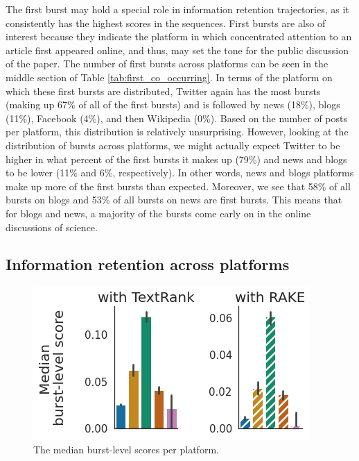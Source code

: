 \documentclass[letterpaper]{article} %
\begin{document}
The first burst may hold a special role in information retention trajectories, as it consistently has the highest scores in the sequences. First bursts are also of interest because they indicate the platform in which concentrated attention to an article first appeared online, and thus, may set the tone for the public discussion of the paper. The number of first bursts across platforms can be seen in the middle section of Table \ref{tab:first_co_occurring}. In terms of the platform on which these first bursts are distributed, Twitter again has the most bursts (making up 67\% of all of the first bursts) and is followed by news (18\%), blogs (11\%), Facebook (4\%), and then Wikipedia (0\%). Based on the number of posts per platform, this distribution is relatively unsurprising. However, looking at the distribution of bursts across platforms, we might actually expect Twitter to be higher in what percent of the first bursts it makes up (79\%) and news and blogs to be lower (11\% and 6\%, respectively). In other words, news and blogs platforms make up more of the first bursts than expected. Moreover, we see that 58\% of all bursts on blogs and 53\% of all bursts on news are first bursts. This means that for blogs and news, a majority of the bursts come early on in the online discussions of science.

\subsection{Information retention across platforms}

\begin{figure}[t]
    \centering
    \includegraphics[width=0.9\columnwidth]{figs/median_scores_platforms.png}
    \caption{The median burst-level scores per platform.}
    \label{fig:burst_medianscore_platform}
\end{figure}
\end{document}
